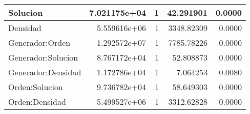 \documentclass[12pt]{article}
\begin{document}
\begin{table}[H]
{\begin{tabular}{|l|r|r|r|r|}
Solucion                              & 7.021175e+04                                                                               & 1                                                                                           & 42.291901                                                                            & 0.0000                                           \\ \hline
Densidad                              & 5.559616e+06                                                                               & 1                                                                                           & 3348.82309                                                                           & 0.0000                                           \\ \hline
Generador:Orden                       & 1.292572e+07                                                                               & 1                                                                                           & 7785.78226                                                                           & 0.0000                                           \\ \hline
Generador:Solucion                    & 8.767172e+04                                                                               & 1                                                                                           & 52.808873                                                                            & 0.0000                                           \\ \hline
Generador:Densidad                    & 1.172786e+04                                                                               & 1                                                                                           & 7.064253                                                                             & 0.0080                                           \\ \hline
Orden:Solucion                        & 9.736782e+04                                                                               & 1                                                                                           & 58.649303                                                                            & 0.0000                                           \\ \hline
Orden:Densidad                        & 5.499527e+06                                                                               & 1                                                                                           & 3312.62828                                                                           & 0.0000                                           \\ \hline

\end{tabular}}
\end{table}
\end{document}
